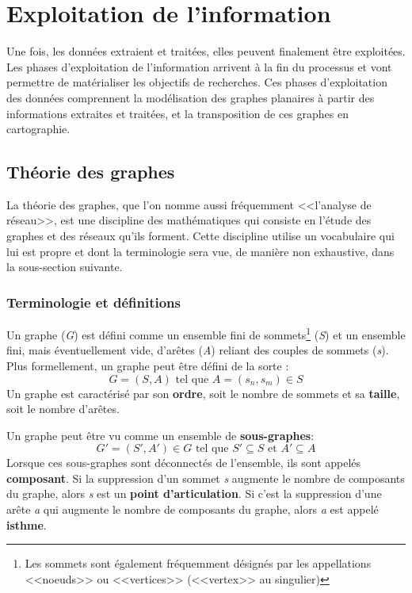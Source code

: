 \section{Exploitation de l'information}
Une fois, les données extraient et traitées, elles peuvent finalement être exploitées.
Les phases d'exploitation de l'information  arrivent à la fin du processus et vont permettre de matérialiser les objectifs de recherches. Ces phases d'exploitation des données comprennent la modélisation des graphes planaires à partir des informations extraites et traitées, et la transposition de ces graphes en cartographie.

\subsection{Théorie des graphes}
La théorie des graphes, que l'on nomme aussi fréquemment <<l'analyse de réseau>>, est une discipline des mathématiques qui consiste en l'étude des graphes et des réseaux qu'ils forment. Cette discipline utilise un vocabulaire qui lui est propre et dont la terminologie sera vue, de manière non exhaustive, dans la sous-section suivante.

\subsubsection{Terminologie et définitions}
Un graphe (\textit{G})  est défini comme un ensemble fini de sommets\footnote{Les sommets sont également fréquemment désignés par les appellations <<noeuds>> ou <<vertices>> (<<vertex>> au singulier) } (\textit{S}) et un ensemble fini, mais éventuellement vide, d'arêtes (\textit{A}) reliant des couples de sommets (\textit{s}). Plus formellement, un graphe peut être défini de la sorte : 
 \[ \boxed{ \; G = (S,A) \text{ tel que }A = (s_{n},s_{m}) \in S \; }\]  
Un graphe est caractérisé par son \textbf{ordre},  soit  le nombre de sommets et sa \textbf{taille}, soit le nombre d'arêtes.

Un graphe peut être vu comme un ensemble de \textbf{sous-graphes}: \[ \boxed{G'=(S',A') \in G \text{ tel que } S'\subseteq S \text{ et } A'\subseteq A} \]  
Lorsque ces sous-graphes sont déconnectés de l'ensemble, ils sont appelés \textbf{composant}. Si la suppression d'un sommet \textit{s} augmente le nombre de composants du graphe, alors \textit{s} est un \textbf{point d'articulation}. Si c'est la suppression d'une arête \textit{a} qui augmente le nombre de composants du graphe, alors \textit{a} est appelé \textbf{isthme}.

